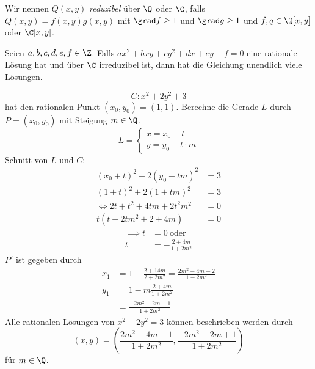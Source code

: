 Wir nennen $Q(x,y)$ \emph{reduzibel} über $\Q$ oder $\C$, falls $Q(x,y) = f(x,y)g(x,y)$ mit $\grad f \geq1$ und $\grad g \geq 1$ und $f,q \in \Q[x,y]$ oder $\C[x,y]$.

\begin{thm}\autolabel
	Seien $a,b,c,d,e,f \in \Z$. Falls $ ax^2+bxy+cy^2+dx+ey+f = 0$ eine rationale Lösung hat und über $\C$ irreduzibel ist, dann hat die Gleichung unendlich viele Lösungen.
\end{thm}

\begin{exmp*}
	\[ C: x^2+2y^2+3 \]
	hat den rationalen Punkt $(x_0,y_0) = (1,1)$. Berechne die Gerade $L$ durch $P = (x_0,y_0)$ mit Steigung $m \in \Q$.
	\[ L = \begin{cases}
		x = x_0 + t\\
		y = y_0 + t \cdot m
	\end{cases} \]
	Schnitt von $L$ und $C$:
	\begin{align*}
		(x_0+t)^2 + 2(y_0+tm)^2 &= 3\\
		(1+t)^2 + 2(1+tm)^2 &= 3\\
		\iff 2t + t^2 + 4tm + 2t^2m^2 &= 0\\
		t(t+2tm^2 + 2 + 4m) &= 0
	\end{align*}
	\begin{align*}
		\implies t &= 0 \ \text{oder}\\
		t &= -\frac{2+4m}{1+2m^2}
	\end{align*}
	$P'$ ist gegeben durch
	\begin{align*}
		x_1 &= 1- \frac{2+14m}{2+2m^2} = \frac{2m^2 - 4m - 2}{1-2m^2}\\
		y_1 &= 1-m \frac{2+4m}{1+2m^2}\\
		&= \frac{-2m^2 - 2m+1}{1+2m^2}
	\end{align*}
	Alle rationalen Lösungen von $x^2+2y^2 = 3$ können beschrieben werden durch
	\[ (x,y) = \left( \frac{2m^2-4m-1}{1+2m^2} , \frac{-2m^2 - 2m + 1}{1 + 2m^2} \right) \]
	für $m \in \Q$.
\end{exmp*}